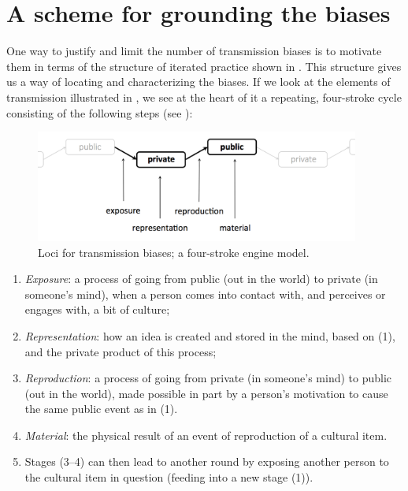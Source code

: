 \section{A scheme for grounding the biases}


One way to justify and limit the number of transmission 
biases is to motivate them in terms of the structure of iterated practice shown in . This structure gives us a way of locating and characterizing the biases. 
If we look at the elements of transmission illustrated in , we see 
at the heart of it a repeating, four-stroke cycle consisting of the following steps (see ): 



\begin{figure}[h]
\includegraphics[width=0.95\textwidth,keepaspectratio]{figures/ch02fig02}
\caption{Loci for transmission biases; a four-stroke engine model.}
\label{fourstroke}
\end{figure}


\begin{enumerate}
 
\item \textit{Exposure}: a process of going from public (out in the world) to private (in someone's mind), 
when a person comes into contact with, and 
perceives or engages with, a bit of culture;



\item \textit{Representation}: how an idea is created and stored in the mind, based on (1), and the private product of this process;



\item \textit{Reproduction}: a process of going from private (in someone's mind) to public (out in the world), 
made possible in part by a person's motivation to cause the same 
public event as in (1). 



\item \textit{Material}: the physical result of an 
event of reproduction of a cultural item.



\item Stages (3--4) can then lead to another round by exposing another 
person to the cultural item in question (feeding into a new stage (1)). 

\end{enumerate}








